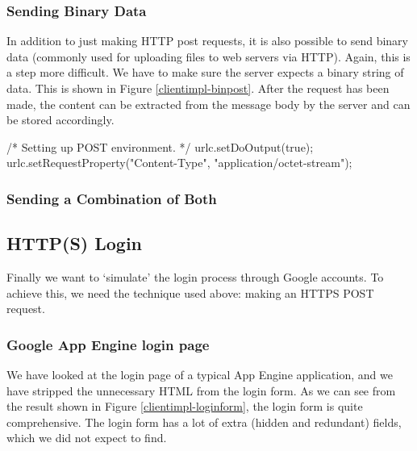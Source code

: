 \subsubsection{Sending Binary Data}
In addition to just making HTTP post requests, it is also possible to send binary
data (commonly used for uploading files to web servers via HTTP). Again, this is
a step more difficult. We have to make sure the server expects a binary string of
data. This is shown in Figure \ref{clientimpl-binpost}. After the request has
been made, the content can be extracted from the message body by the server and
can be stored accordingly.

\begin{figure*}[ht] %
\begin{center}
\begin{code}
/* Setting up POST environment. */
urlc.setDoOutput(true);
urlc.setRequestProperty("Content-Type", "application/octet-stream");
\end{code}
\caption{Making a binary HTTP POST request.\label{clientimpl-binpost}}
\end{center}
\end{figure*}

\subsubsection{Sending a Combination of Both}
\label{clientimpl-sending-both}


\subsection{HTTP(S) Login}
Finally we want to `simulate' the login process through Google accounts. To
achieve this, we need the technique used above: making an HTTPS POST request.

\subsubsection{Google App Engine login page}
We have looked at the login page of a typical App Engine application, and we
have stripped the unnecessary HTML from the login form. As we can see from the
result shown in Figure \ref{clientimpl-loginform}, the login form is quite
comprehensive. The login form has a lot of extra (hidden and redundant) fields,
which we did not expect to find.

